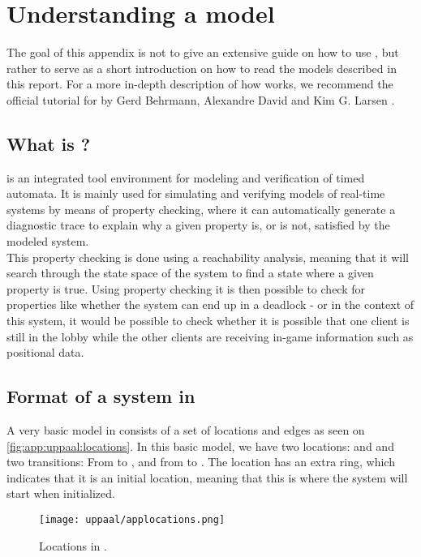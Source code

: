 \section{Understanding a \uppaal model}

The goal of this appendix is not to give an extensive guide on how to use \uppaal, but rather to serve as a short introduction on how to read the models described in this report.
For a more in-depth description of how \uppaal works, we recommend the official tutorial for  by Gerd Behrmann, Alexandre David and Kim G. Larsen \cite{uppaaltutorial}.

\subsection{What is \uppaal?}
\uppaal is an integrated tool environment for modeling and verification of timed automata.
It is mainly used for simulating and verifying models of real-time systems \cite{uppaalintro} by means of property checking, where it can automatically generate a diagnostic trace to explain why a given property is, or is not, satisfied by the modeled system.\\
This property checking is done using a reachability analysis, meaning that it will search through the state space of the system to find a state where a given property is true.
Using property checking it is then possible to check for properties like whether the system can end up in a deadlock - or in the context of this system, it would be possible to check whether it is possible that one client is still in the lobby while the other clients are receiving in-game information such as positional data.

\subsection{Format of a system in \uppaal}
A very basic model in \uppaal consists of a set of locations and edges as seen on \autoref{fig:app:uppaal:locations}.
In this basic model, we have two locations:  and  and two transitions: From  to , and from  to .
The location  has an extra ring, which indicates that it is an initial location, meaning that this is where the system will start when initialized.

\begin{figure}[H]
    \centering
    \texttt{[image: uppaal/applocations.png]}
    \caption{Locations in \uppaal.}
    \label{fig:app:uppaal:locations}
\end{figure}

